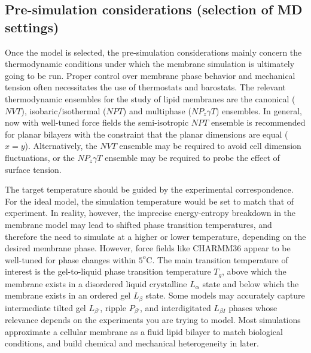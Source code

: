 \documentclass[9pt,bestpractices]{livecoms}
\begin{document}
\subsection{Pre-simulation considerations (selection of MD settings)}
\label{subsec:presim3}
Once the model is selected, the pre-simulation considerations mainly concern the thermodynamic conditions under which the membrane simulation is ultimately going to be run.
Proper control over membrane phase behavior and mechanical tension often necessitates the use of thermostats and barostats.
The relevant thermodynamic ensembles for the study of lipid membranes are the canonical ($NVT$), isobaric/isothermal ($NPT$) and multiphase ($NP_z \gamma T$) ensembles.
In general, now with well-tuned force fields the semi-isotropic $NPT$ ensemble is recommended for planar bilayers with the constraint that the planar dimensions are equal ($x=y$).
Alternatively, the $NVT$ ensemble may be required to avoid cell dimension fluctuations, or the $NP_z \gamma T$ ensemble may be required to probe the effect of surface tension.

The target temperature should be guided by the experimental correspondence.
For the ideal model, the simulation temperature would be set to match that of experiment.
In reality, however, the imprecise energy-entropy breakdown in the membrane model may lead to shifted phase transition temperatures, and therefore the need to simulate at a higher or lower temperature, depending on the desired membrane phase.
However, force fields like CHARMM36 \cite{Klauda2010d} appear to be well-tuned for phase changes within $5^o$C.
The main transition temperature of interest is the gel-to-liquid phase transition temperature $T_g$, above which the membrane exists in a disordered liquid crystalline $L_\alpha$ state and below which the membrane exists in an ordered gel $L_\beta$ state.
Some models may accurately capture intermediate tilted gel $L_{\beta '}$, ripple $P_{\beta '}$, and interdigitated $L_{\beta I}$ phases whose relevance depends on the experiments you are trying to model.
Most simulations approximate a cellular membrane as a fluid lipid bilayer to match biological conditions, and build chemical and mechanical heterogeneity in later.
\end{document}
